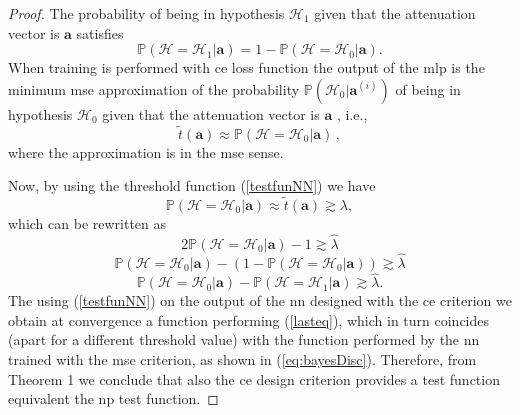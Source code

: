 \documentclass[draftcls,onecolumn,12pt]{IEEEtran}
\begin{document}
\begin{proof}
The probability of being in hypothesis $\mathcal{H}_1$ given that the attenuation vector is $\bm{a}$ satisfies
\begin{equation}
    \mathbb{P}(\mathcal{H} = \mathcal{H}_1|\bm{a} ) = 1- \mathbb{P}(\mathcal{H} = \mathcal{H}_0|\bm{a} ).
\end{equation}
When training is performed with \ac{ce} loss function the output of the \ac{mlp} is the minimum \ac{mse} approximation of the probability $\mathbb{P}(\mathcal{H}_0|\bm{a}^{(i)})$ of being in hypothesis $\mathcal{H}_0$ given that the attenuation vector is $\bm{a}$ \cite{Bishop2006}, i.e.,
\begin{equation}
    \tilde{t}(\bm{a}) \approx \mathbb{P}(\mathcal{H}=\mathcal{H}_0|\bm{a})\,,
\end{equation} 
where the approximation is in the \ac{mse} sense. 

Now, by using the threshold function (\ref{testfunNN}) we have 
\begin{equation}
    \mathbb{P}(\mathcal{H}=\mathcal{H}_0|\bm{a}) \approx  \tilde{t}(\bm{a}) \gtrsim \lambda,
\end{equation}
which can be rewritten as
\begin{equation}
    2\mathbb{P}(\mathcal{H}=\mathcal{H}_0|\bm{a} )-1 \gtrsim \hat{\lambda}
\end{equation}
\begin{equation}
    \mathbb{P}(\mathcal{H}=\mathcal{H}_0|\bm{a} )-(1-\mathbb{P}(\mathcal{H}=\mathcal{H}_0|\bm{a} )) \gtrsim \hat{\lambda}
\end{equation}
\begin{equation}
\label{lasteq}
    \mathbb{P}(\mathcal{H}=\mathcal{H}_0|\bm{a} )-\mathbb{P}(\mathcal{H}=\mathcal{H}_1|\bm{a} ) \gtrsim \hat{\lambda}.
\end{equation}
The using (\ref{testfunNN}) on the output of the \ac{nn} designed with the \ac{ce} criterion we obtain at convergence a function performing (\ref{lasteq}), which in turn coincides (apart for a different threshold value) with the function performed by the \ac{nn} trained with the \ac{mse} criterion, as shown in (\ref{eq:bayesDisc}). Therefore, from Theorem 1 we conclude that also the \ac{ce} design criterion provides a test function equivalent the \ac{np} test function.
\end{proof}
\end{document}
